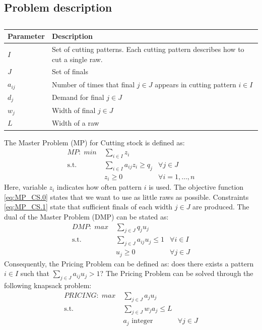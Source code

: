 \documentclass[a4paper]{article}
\begin{document}
\subsection{Problem description}
\begin{table}[h]
\begin{tabular}{ll}
\toprule
\textbf{Parameter} 	& \textbf{Description}\\
\midrule
$I$		& Set of cutting patterns. Each cutting pattern describes how to cut a single raw.\\
$J$		& Set of finals\\
$a_{ij}$		& Number of times that final $j\in J$ appears in cutting pattern $i\in I$\\
$d_j$		& Demand for final $j\in J$\\
$w_j$		& Width of final $j\in J$\\
$L$		& Width of a raw\\
\bottomrule
\end{tabular}
\caption{}
\label{tbl:cutting_stock} 
\end{table}

The Master Problem (MP) for Cutting stock is defined as:
\begin{align}
\label{eq:MP_CS.0} \mathit{MP:}\; min\; &\sum_{i\in I} z_i &\\
\label{eq:MP_CS.1} \mbox{s.t. }&\sum_{i \in I} a_{ij}z_i\geq q_j & \forall j\in J\\
\label{eq:MP_CS.2} &z_i\geq 0 &\forall i=1,\dots,n
\end{align}
Here, variable $z_i$ indicates how often pattern $i$ is used. The objective function \eqref{eq:MP_CS.0} states that we want to use as little raws as possible. Constraints \eqref{eq:MP_CS.1} state that sufficient finals of each width $j\in J$ are produced. The dual of the Master Problem (DMP) can be stated as:
\begin{align}
\label{eq:DMP_CS.0} \mathit{DMP:}\; max\; &\sum_{j\in J} q_ju_j &\\
\label{eq:DMP_CS.1} \mbox{s.t. }&\sum_{j\in J} a_{ij}u_j\leq 1 & \forall i\in I\\
\label{eq:DMP_CS.2} &u_j\geq 0 &\forall j\in J
\end{align}
Consequently, the Pricing Problem can be defined as: does there exists a pattern $i\in I$ such that $\sum_{j\in J}a_{ij}u_j>1$? The Pricing Problem can be solved through the following knapsack problem:
\begin{align}
\label{eq:PRICE_CS.0} \mathit{PRICING:}\; max\; &\sum_{j\in J} a_ju_j &\\
\label{eq:PRICE_CS.1} \mbox{s.t. }&\sum_{j\in J} w_ja_j\leq L & \\
\label{eq:PRICE_CS.2} &a_j\mbox{ integer} &\forall j\in J
\end{align}
\end{document}
